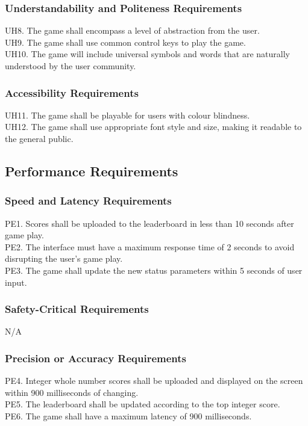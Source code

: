 \documentclass[12pt]{article}
\begin{document}
    \subsubsection{Understandability and Politeness Requirements}
    UH8. The game shall encompass a level of abstraction from the user.\\
    UH9. The game shall use common control keys to play the game.\\
    UH10. The game will include universal symbols and words that are naturally understood by the user community.
    
    \subsubsection{Accessibility Requirements}
    UH11. The game shall be playable for users with colour blindness.\\
    UH12. The game shall use appropriate font style and size, making it readable to the general public.
    
\subsection{Performance Requirements}
    \subsubsection{Speed and Latency Requirements}
    PE1. Scores shall be uploaded to the leaderboard in less than 10 seconds after game play.\\
    PE2. The interface must have a maximum response time of 2 seconds to avoid disrupting the user's game play.\\
    PE3. The game shall update the new status parameters within 5 seconds of user input.

    \subsubsection{Safety-Critical Requirements}
    N/A
    
    \subsubsection{Precision or Accuracy Requirements}
    PE4. Integer whole number scores shall be uploaded and displayed on the screen within 900 milliseconds of changing.\\
    PE5. The leaderboard shall be updated according to the top integer score.\\
    PE6. The game shall have a maximum latency of 900 milliseconds.
    
\end{document}
